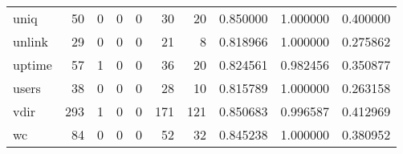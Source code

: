 \begin{longtable}{lrrrrrrrrr}
uniq      &                                        50 &                                                  0 &                                                  0 &                                                  0 &                                                 30 &                                                 20 &                                           0.850000 &                               1.000000 &                             0.400000 \\
unlink    &                                        29 &                                                  0 &                                                  0 &                                                  0 &                                                 21 &                                                  8 &                                           0.818966 &                               1.000000 &                             0.275862 \\
uptime    &                                        57 &                                                  1 &                                                  0 &                                                  0 &                                                 36 &                                                 20 &                                           0.824561 &                               0.982456 &                             0.350877 \\
users     &                                        38 &                                                  0 &                                                  0 &                                                  0 &                                                 28 &                                                 10 &                                           0.815789 &                               1.000000 &                             0.263158 \\
vdir      &                                       293 &                                                  1 &                                                  0 &                                                  0 &                                                171 &                                                121 &                                           0.850683 &                               0.996587 &                             0.412969 \\
wc        &                                        84 &                                                  0 &                                                  0 &                                                  0 &                                                 52 &                                                 32 &                                           0.845238 &                               1.000000 &                             0.380952 \\

\end{longtable}
